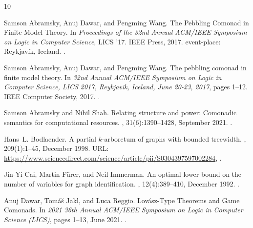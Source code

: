 \documentclass[10pt,a4paper]{article}
\begin{document}
\begin{thebibliography}{10}

Samson Abramsky, Anuj Dawar, and Pengming Wang.
\newblock The {Pebbling} {Comonad} in {Finite} {Model} {Theory}.
\newblock In {\em Proceedings of the 32nd {Annual} {ACM}/{IEEE} {Symposium} on
  {Logic} in {Computer} {Science}}, {LICS} '17. IEEE Press, 2017.
\newblock event-place: Reykjavík, Iceland.
\newblock \href {https://doi.org/10.1109/LICS.2017.8005129}
  {}.

Samson Abramsky, Anuj Dawar, and Pengming Wang.
\newblock The pebbling comonad in finite model theory.
\newblock In {\em 32nd Annual {ACM/IEEE} Symposium on Logic in Computer
  Science, {LICS} 2017, Reykjavik, Iceland, June 20-23, 2017}, pages 1--12.
  {IEEE} Computer Society, 2017.
\newblock \href {https://doi.org/10.1109/LICS.2017.8005129}
  {}.

Samson Abramsky and Nihil Shah.
\newblock Relating structure and power: {Comonadic} semantics for computational
  resources.
, 31(6):1390--1428, September
  2021.
\newblock \href {https://doi.org/10.1093/logcom/exab048}
  {}.

Hans~L. Bodlaender.
\newblock A partial $k$-arboretum of graphs with bounded treewidth.
, 209(1):1--45, December 1998.
\newblock URL:
  \url{https://www.sciencedirect.com/science/article/pii/S0304397597002284},
  \href {https://doi.org/10.1016/S0304-3975(97)00228-4}
  {}.

Jin-Yi Cai, Martin Fürer, and Neil Immerman.
\newblock An optimal lower bound on the number of variables for graph
  identification.
, 12(4):389--410, December 1992.
\newblock \href {https://doi.org/10.1007/BF01305232}
  {}.

Anuj Dawar, Tomá\v{s} Jakl, and Luca Reggio.
\newblock Lovász-{Type} {Theorems} and {Game} {Comonads}.
\newblock In {\em 2021 36th {Annual} {ACM}/{IEEE} {Symposium} on {Logic} in
  {Computer} {Science} ({LICS})}, pages 1--13, June 2021.
\newblock \href {https://doi.org/10.1109/LICS52264.2021.9470609}
  {}.


\end{thebibliography}
\end{document}
